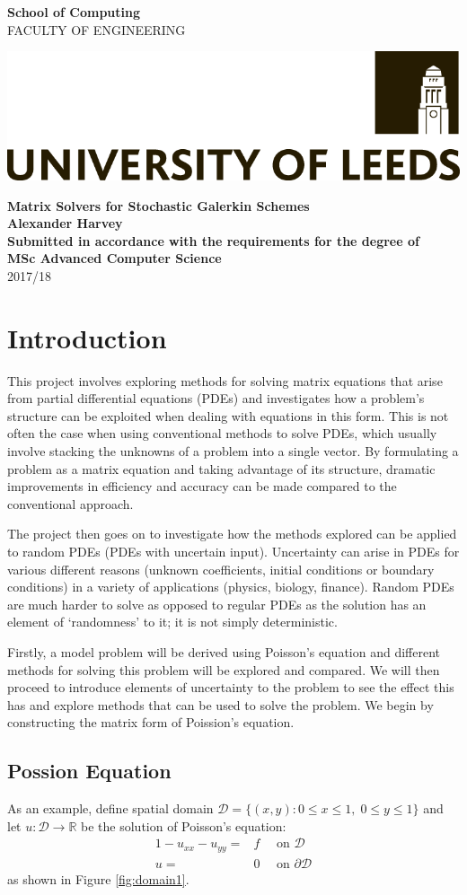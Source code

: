 \documentclass[11pt]{article}
\numberwithin{equation}{section}
\newcommand{\projectTitle}{Matrix Solvers for Stochastic Galerkin Schemes}
\newcommand{\fullname}{Alexander Harvey}
\newcommand{\degreeTitle}{MSc Advanced Computer Science}
\newcommand{\session}{2017/18}
\newcommand{\frontcover}{
\begin{titlepage}
\newgeometry{left=25mm,right=25mm,top=45mm,bottom=0.1cm}

\begin{minipage}[t]{7cm}
\noindent\textbf{\Large{School of Computing}}\\
{\fontfamily{ptm}\selectfont 
\uppercase{faculty of engineering}
}
\end{minipage}
\hfill
\begin{minipage}[t]{7cm}
\vspace*{-25pt}
\includegraphics[scale=0.2,right]{logo_black.png}
\vspace*{-1pt}
\end{minipage}

\noindent\makebox[\linewidth]{\rule{\paperwidth}{0.4pt}}

\centering
\vspace*{37mm}
\textbf{\Large\projectTitle}\\
\vspace*{10mm}
\textbf{\large\fullname}\\
\vspace*{10mm}
\textbf{Submitted in accordance with the requirements for the degree of}\\
\textbf{\degreeTitle}\\
\vspace*{10mm}
\session\\
\restoregeometry
\end{titlepage}
}
\begin{document}
\frontcover

\newpage


\tableofcontents

\clearpage


\section{Introduction}
This project involves exploring methods for solving matrix equations that arise from partial differential equations (PDEs) and investigates how a problem's structure can be exploited when dealing with equations in this form. This is not often the case when using conventional methods to solve PDEs, which usually involve stacking the unknowns of a problem into a single vector. By formulating a problem as a matrix equation and taking advantage of its structure, dramatic improvements in efficiency and accuracy can be made compared to the conventional approach. 

The project then goes on to investigate how the methods explored can be applied to random PDEs (PDEs with uncertain input). Uncertainty can arise in PDEs for various different reasons (unknown coefficients, initial conditions or boundary conditions) in a variety of applications (physics, biology, finance). Random PDEs are much harder to solve as opposed to regular PDEs as the solution has an element of `randomness' to it; it is not simply deterministic. 

Firstly, a model problem will be derived using Poisson's equation and different methods for solving this problem will be explored and compared. We will then proceed to introduce elements of uncertainty to the problem to see the effect this has and explore methods that can be used to solve the problem. We begin by constructing the matrix form of Poission's equation.

\subsection{Possion Equation}
As an example, define spatial domain $\mathcal{D} = \{(x,y) : 0 \leq x \leq 1, \; 0 \leq y \leq 1 \}$ and let $u: \mathcal{D} \to \mathbb{R}$ be the solution of Poisson's equation:
	\begin{alignat}{1} 
	-u_{xx} - u_{yy} = {} & f \quad \text{ on } \mathcal{D} \nonumber \\
	u = {} & 0 \quad \text{ on } \partial \mathcal{D}
	\end{alignat}
as shown in Figure \ref{fig:domain1}.
\end{document}
